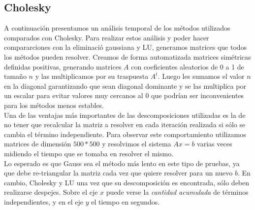 \subsection{Cholesky}

A continuación presentamos un análisis temporal de los métodos utilizados comparados con Cholesky. Para realizar estos análisis y poder hacer compararciones con la eliminació gaussiana y LU, generamos matrices que todos los métodos pueden resolver. Creamos de forma automatizada matrices simétricas definidas positivas, generando matrices $A$ con coeficientes aleatorios de 0 a 1 de tamaño $n$ y las multiplicamos por su traspuesta $A^{t}$. Luego les sumamos el valor $n$ en la diagonal garantizando que sean diagonal dominante y se las multiplica por un escalar para evitar valores muy cercanos al 0 que podrían ser inconvenientes para los métodos menos estables. \\


Una de las ventajas más importantes de las descomposiciones utilizadas es la de no tener que recalcular la matriz a resolver en cada iteración realizada si sólo se cambia el término independiente. Para observar este comportamiento utilizamos matrices de dimensión $500*500$ y resolvimos el sistema $Ax = b$ varias veces midiendo el tiempo que se tomaba en resolver el mismo. \\

Lo esperado es que Gauss sea el método más lento en este tipo de pruebas, ya que debe re-triangular la matriz cada vez que quiere resolver para un nuevo $b$. En cambio, Cholesky y LU una vez que su descomposición es encontrada, sólo deben realizarse despejes. Sobre el eje $x$ puede verse la \textit{cantidad acumulada} de términos independientes, y en el eje $y$ el tiempo en segundos. \\


